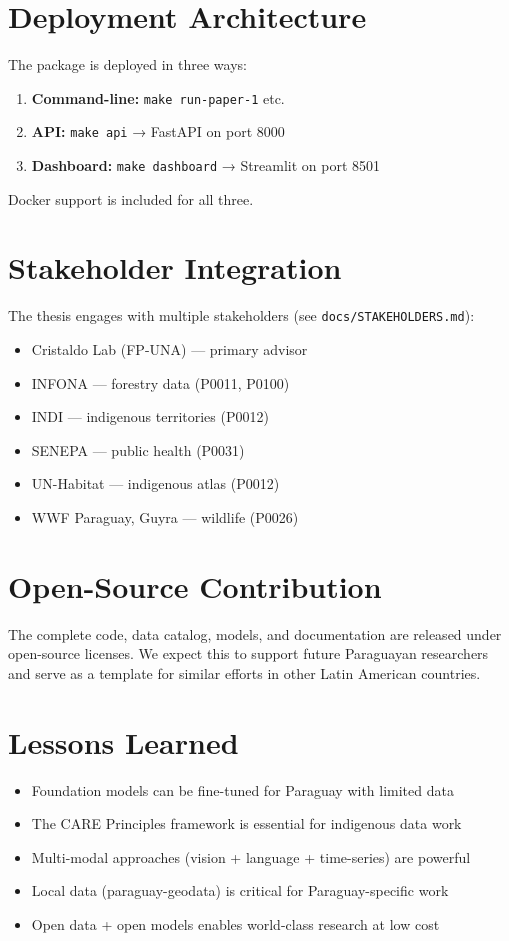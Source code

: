 \section{Deployment Architecture}

The package is deployed in three ways:

\begin{enumerate}
    \item \textbf{Command-line:} \texttt{make run-paper-1} etc.
    \item \textbf{API:} \texttt{make api} → FastAPI on port 8000
    \item \textbf{Dashboard:} \texttt{make dashboard} → Streamlit on port 8501
\end{enumerate}

Docker support is included for all three.

\section{Stakeholder Integration}

The thesis engages with multiple stakeholders (see \texttt{docs/STAKEHOLDERS.md}):

\begin{itemize}
    \item Cristaldo Lab (FP-UNA) — primary advisor
    \item INFONA — forestry data (P0011, P0100)
    \item INDI — indigenous territories (P0012)
    \item SENEPA — public health (P0031)
    \item UN-Habitat — indigenous atlas (P0012)
    \item WWF Paraguay, Guyra — wildlife (P0026)
\end{itemize}

\section{Open-Source Contribution}

The complete code, data catalog, models, and documentation are released
under open-source licenses. We expect this to support future Paraguayan
researchers and serve as a template for similar efforts in other Latin
American countries.

\section{Lessons Learned}

\begin{itemize}
    \item Foundation models can be fine-tuned for Paraguay with limited data
    \item The CARE Principles framework is essential for indigenous data work
    \item Multi-modal approaches (vision + language + time-series) are powerful
    \item Local data (paraguay-geodata) is critical for Paraguay-specific work
    \item Open data + open models enables world-class research at low cost
\end{itemize}
